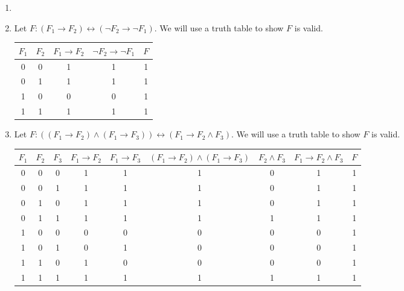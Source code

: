 \begin{exer}[1.2]
\begin{enumerate}[label=(\alph*)]
        \item %
        \item %
            Let $F: (F_1 \rightarrow F_2) \leftrightarrow (\neg F_2 \rightarrow \neg F_1)$.
            We will use a truth table to show $F$ is valid.
            \begin{center}
                \begin{tabular}{ |c|c||c|c|c| }
                    \hline
                        $F_1$ & $F_2$ & $F_1 \rightarrow F_2$ & $\neg F_2 \rightarrow \neg F_1$ & $F$ \\ \hline
                        0 & 0 & 1 & 1 & 1 \\ \hline
                        0 & 1 & 1 & 1 & 1 \\ \hline
                        1 & 0 & 0 & 0 & 1 \\ \hline
                        1 & 1 & 1 & 1 & 1 \\ \hline
                \end{tabular}
            \end{center}
            \addtocounter{enumi}{4} %
        \item %
            Let $F: ((F_1 \rightarrow F_2) \land (F_1 \rightarrow F_3)) \leftrightarrow (F_1 \rightarrow F_2 \land F_3)$.
            We will use a truth table to show $F$ is valid.
            \begin{center}
                \begin{tabular}{ |c|c|c||c|c|c|c|c|c| }
                    \hline
                        $F_1$ & $F_2$ & $F_3$ & $F_1 \rightarrow F_2$ & $F_1 \rightarrow F_3$ & $(F_1 \rightarrow F_2) \land (F_1 \rightarrow F_3)$ &
                                $F_2 \land F_3$ & $F_1 \rightarrow F_2 \land F_3$ & $F$ \\
                    \hline
                        0 & 0 & 0 & 1 & 1 & 1 & 0 & 1 & 1  \\
                    \hline
                        0 & 0 & 1 & 1 & 1 & 1 & 0 & 1 & 1  \\
                    \hline
                        0 & 1 & 0 & 1 & 1 & 1 & 0 & 1 & 1  \\
                    \hline
                        0 & 1 & 1 & 1 & 1 & 1 & 1 & 1 & 1  \\
                    \hline
                        1 & 0 & 0 & 0 & 0 & 0 & 0 & 0 & 1  \\
                    \hline
                        1 & 0 & 1 & 0 & 1 & 0 & 0 & 0 & 1  \\
                    \hline
                        1 & 1 & 0 & 1 & 0 & 0 & 0 & 0 & 1  \\
                    \hline
                        1 & 1 & 1 & 1 & 1 & 1 & 1 & 1 & 1  \\
                    \hline
                \end{tabular}
            \end{center}
    \end{enumerate}
\end{exer}

